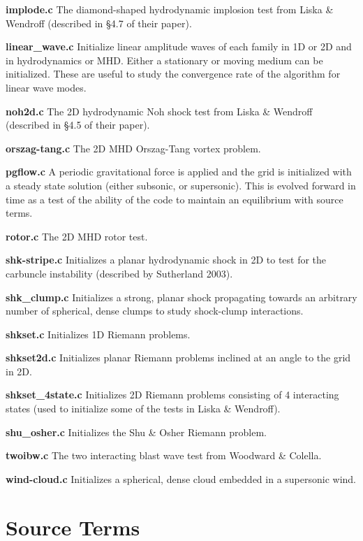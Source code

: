\bigskip
\noindent
{\bf implode.c}
The diamond-shaped hydrodynamic implosion test from Liska \& Wendroff
(described in \S 4.7 of their paper).

\bigskip
\noindent
{\bf linear\_wave.c}
Initialize linear amplitude waves of each family in 1D or 2D and in
hydrodynamics or MHD.  Either a stationary or moving medium can be
initialized.  These are
useful to study the convergence rate of the algorithm for linear wave
modes.

\bigskip
\noindent
{\bf noh2d.c}
The 2D hydrodynamic Noh shock test from Liska \& Wendroff (described in
\S 4.5 of their paper).

\bigskip
\noindent
{\bf orszag-tang.c}
The 2D MHD Orszag-Tang vortex problem.

\bigskip
\noindent
{\bf pgflow.c} A periodic gravitational force is applied and the grid
is initialized with a steady state solution (either subsonic, or
supersonic).  This is evolved forward in time as a test of the ability
of the code to maintain an equilibrium with source terms.

\bigskip
\noindent
{\bf rotor.c}
The 2D MHD rotor test.

\bigskip
\noindent
{\bf shk-stripe.c}
Initializes a planar hydrodynamic shock in 2D to test for the
carbuncle instability (described by Sutherland 2003).

\bigskip
\noindent
{\bf shk\_clump.c}  Initializes a strong, planar shock propagating towards
an arbitrary number of spherical, dense clumps to study shock-clump 
interactions.

\bigskip
\noindent
{\bf shkset.c}
Initializes 1D Riemann problems.

\bigskip
\noindent
{\bf shkset2d.c}
Initializes planar Riemann problems inclined at an angle to the grid in 2D.

\bigskip
\noindent
{\bf shkset\_4state.c}
Initializes 2D Riemann problems consisting of 4 interacting states (used
to initialize some of the tests in Liska \& Wendroff).

\bigskip
\noindent
{\bf shu\_osher.c}
Initializes the Shu \& Osher Riemann problem.

\bigskip
\noindent
{\bf twoibw.c}
The two interacting blast wave test from Woodward \& Colella.

\bigskip
\noindent
{\bf wind-cloud.c}
Initializes a spherical, dense cloud embedded in a supersonic wind.

\section{Source Terms}

